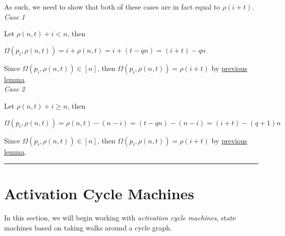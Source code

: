 \documentclass[a4paper,12pt]{article}
\begin{document}
\noindent As such, we need to show that both of these cases are in fact equal to $\rho(i + t)$.\\


\noindent
\textit{Case 1}

\noindent Let $\rho(n, t) + i < n$, then 
\begin{center}
$\Omega(p_i, \rho(n, t)) = i + \rho(n, t) = i + (t - qn) = (i + t) - qn$
\end{center}
Since $\Omega(p_i, \rho(n, t)) \in [n]$, then $\Omega(p_i, \rho(n, t)) = \rho(i + t)$ by \hyperlink{lemma:remainder_subtraction}{previous lemma}.\\


\noindent
\textit{Case 2}

\noindent Let $\rho(n, t) + i \geq n$, then 
\begin{center}
$\Omega(p_i, \rho(n, t)) = \rho(n, t) - (n - i) = (t - qn) - (n - i) = (i + t) - (q + 1)n$
\end{center}

\noindent Since $\Omega(p_i, \rho(n, t)) \in [n]$, then $\Omega(p_i, \rho(n, t)) = \rho(i + t)$ by \hyperlink{lemma:remainder_subtraction}{previous lemma}.


\begin{center}
\noindent\rule{8cm}{0.4pt}
\end{center}







\section{Activation Cycle Machines}
\label{section:activation_cycle_machines}
\hypertarget{section:activation_cycle_machines}{}

\noindent In this section, we will begin working with \textit{activation cycle machines}, state machines based on taking walks around a cycle graph.\\
\end{document}
